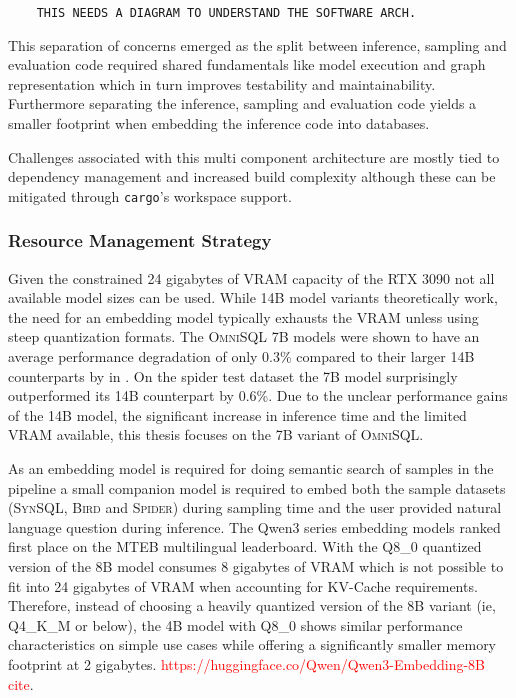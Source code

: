 \begin{verbatim}
    THIS NEEDS A DIAGRAM TO UNDERSTAND THE SOFTWARE ARCH.
\end{verbatim}

This separation of concerns emerged as the split between inference, sampling
and evaluation code required shared fundamentals like model execution and graph
representation which in turn improves testability and maintainability. Furthermore
separating the inference, sampling and evaluation code yields a smaller
footprint when embedding the inference code into databases.

Challenges associated with this multi component architecture are mostly tied to
dependency management and increased build complexity although these can be
mitigated through \texttt{cargo}'s workspace support.

\subsubsection{Resource Management Strategy}

Given the constrained 24 gigabytes of VRAM capacity of the RTX 3090 not all
available model sizes can be used. While 14B model variants theoretically work,
the need for an embedding model typically exhausts the VRAM unless using
steep quantization formats. The \textsc{OmniSQL} 7B models were shown to have
an average performance degradation of only 0.3\% compared to their larger 14B
counterparts by \citeauthor{OmniSQL} in \citeyear{OmniSQL}. On the spider test
dataset the 7B model surprisingly outperformed its 14B counterpart by 0.6\%.
Due to the unclear performance gains of the 14B model, the significant increase
in inference time and the limited VRAM available, this thesis focuses on the 7B
variant of \textsc{OmniSQL}.

As an embedding model is required for doing semantic search of samples in the
pipeline a small companion model is required to embed both the sample datasets
(\textsc{SynSQL}, \textsc{Bird} and \textsc{Spider}) during sampling time and
the user provided natural language question during inference. The Qwen3 series
embedding models ranked first place on the MTEB multilingual leaderboard. With
the Q8\_0 quantized version of the 8B model consumes 8 gigabytes of VRAM which
is not possible to fit into 24 gigabytes of VRAM when accounting for KV-Cache
requirements. Therefore, instead of choosing a heavily quantized version of the
8B variant (ie, Q4\_K\_M or below), the 4B model with Q8\_0 shows similar
performance characteristics on simple use cases while offering a significantly
smaller memory footprint at 2 gigabytes.
\textcolor{red}{https://huggingface.co/Qwen/Qwen3-Embedding-8B cite}.

